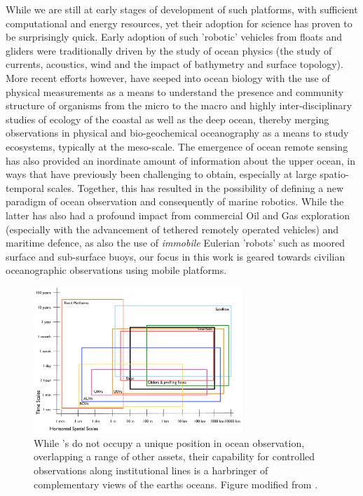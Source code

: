 While we are still at early stages of development of such platforms,
with sufficient computational and energy resources, yet their adoption
for science has proven to be surprisingly quick. Early adoption of
such 'robotic' vehicles from floats and gliders were traditionally
driven by the study of ocean physics (the study of currents,
acoustics, wind and the impact of bathymetry and surface
topology). More recent efforts however, have seeped into ocean biology
with the use of physical measurements as a means to understand the
presence and community structure of organisms from the micro to the
macro and highly inter-disciplinary studies of ecology of the coastal
as well as the deep ocean, thereby merging observations in physical
and bio-geochemical oceanography as a means to study ecosystems,
typically at the meso-scale. The emergence of ocean remote sensing has
also provided an inordinate amount of information about the upper
ocean, in ways that have previously been challenging to obtain,
especially at large spatio-temporal scales. Together, this has
resulted in the possibility of defining a new paradigm of ocean
observation and consequently of marine robotics. While the latter has
also had a profound impact from commercial Oil and Gas exploration
(especially with the advancement of tethered remotely operated
vehicles) and maritime defence, as also the use of \emph{immobile}
Eulerian 'robots' such as moored surface and sub-surface buoys, our
focus in this work is geared towards civilian oceanographic
observations using mobile platforms.


\begin{figure}[!t]
  \centering
  \includegraphics[width=0.7\textwidth]{fig/platform-capabilities.pdf}
  \caption{While \smle's do not occupy a unique position in ocean
    observation, overlapping a range of other assets, their capability
    for controlled observations along institutional lines is a
    harbringer of complementary views of the earths oceans. Figure
    modified from \cite{haury78}. }
  \label{fig:platforms}
\end{figure}


